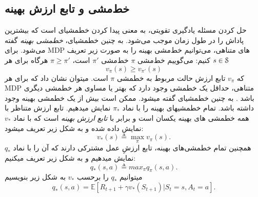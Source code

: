 \subsection{خط‌مشی و تابع ارزش بهینه}
حل کردن مسئله یادگیری تقویتی، به معنی پیدا کردن خط\nf مشی\nf ای است که بیشترین پاداش را در طول زمان موجب می‌شود.	به چنین خط\nf مشی\nf ای، 
\textit{خط\nf مشی بهینه} 
گفته می‌شود. برای
 MDP‌ 
 های متناهی، می‌توانیم خط‌مشی بهینه را به صورت زیر تعریف کنیم:
می‌گوییم خط‌مشی $\pi$  خط‌مشی 
$\pi'$
است،
$\pi \ge \pi'$
هرگاه برای هر 
$s \in \EuScript{S}$
$$v_\pi(s) \ge v_{\pi'}(s)$$
که $v_\pi$ تابع ارزش حالت مربوط به خط\nf مشی $\pi$ است.
 می\nf توان نشان داد که برای هر MDP متناهی، حداقل یک خط\nf مشی وجود دارد که بهتر یا مساوی هر خط\nf مشی دیگری باشد
\cite{suttonbook}.
 به چنین خط\nf مشی\nf ای 
\textit{}
 گفته می\nf  شود. ممکن است بیش از یک خط\nf مشی بهینه وجود داشته باشد. تمام خط\nf مشی\nf های بهینه را با نماد $\pi_*$  نمایش می\nf دهیم. تابع ارزش متناظر با همه خط\nf مشی\nf
های بهینه یکسان است و برابر با 
\textit{تابع ارزش بهینه}
 است که با نماد $v_*$ نمایش داده شده و به شکل زیر تعریف می\nf شود:
$$v_*(s) \triangleq \max_{\pi} v_\pi(s).$$
همچنین تمام خط\nf مشی\nf ‌های بهینه، تابع ارزشِ عمل مشترکی دارند که آن را با نماد $q_*$ نمایش می\nf دهیم و به شکل زیر تعریف می\nf کنیم:
$$q_*(s,a) \triangleq max_{\pi} q_\pi(s,a).$$
می\nf توانیم $q_*$ را برحسب $v_*$ به شکل زیر بنویسیم \cite{suttonbook}
\begin{equation}
q_* (s,a) = \mathbb{E}[R_{t+1} + \gamma v_*(S_{t+1})| S_t=s, A_t=a].
\end{equation}

